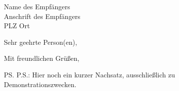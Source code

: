 \documentclass[a4paper, 12pt, halfparskip]{scrlttr2}
\begin{document}
\begin{letter}{
	Name des Empfängers \\
	Anschrift des Empfängers \\
	PLZ Ort
	}

	\opening{Sehr geehrte Person(en),}

	\blindtext %

	\closing{Mit freundlichen Grüßen,}

	\ps{P.S.: Hier noch ein kurzer Nachsatz, ausschließlich zu Demonstrationszwecken.}


\end{letter}
\end{document}
